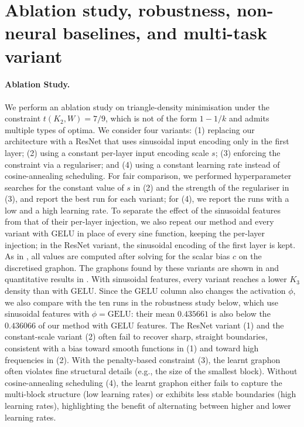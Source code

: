 \documentclass[11pt]{article}
\theoremstyle{plain}
\theoremstyle{definition}
\theoremstyle{remark}
\begin{document}
\section{Ablation study, robustness, non-neural baselines, and multi-task variant}
\label{sec:ablation}

\paragraph{Ablation Study.}
We perform an ablation study on triangle-density minimisation under the constraint $t(K_2,W)=7/9$, which is not of the form $1-1/k$ and admits multiple types of optima.
We consider four variants: (1) replacing our architecture with a ResNet that uses sinusoidal input encoding only in the first layer; (2) using a constant per-layer input encoding scale $s$; (3) enforcing the constraint via a regulariser; and (4) using a constant learning rate instead of cosine-annealing scheduling.
For fair comparison, we performed hyperparameter searches for the constant value of $s$ in (2) and the strength of the regulariser in (3), and report the best run for each variant; for (4), we report the runs with a low and a high learning rate.
To separate the effect of the sinusoidal features from that of their per-layer injection, we also repeat our method and every variant with GELU in place of every sine function, keeping the per-layer injection; in the ResNet variant, the sinusoidal encoding of the first layer is kept.
As in , all values are computed after solving for the scalar bias $c$ on the discretised graphon.
The graphons found by these variants are shown in  and quantitative results in .
With sinusoidal features, every variant reaches a lower $K_3$ density than with GELU. Since the GELU column also changes the activation $\phi$, we also compare with the ten runs in the robustness study below, which use sinusoidal features with $\phi = \mathrm{GELU}$: their mean $0.435661$ is also below the $0.436066$ of our method with GELU features.
The ResNet variant (1) and the constant-scale variant (2) often fail to recover sharp, straight boundaries, consistent with a bias toward smooth functions in (1) and toward high frequencies in (2).
With the penalty-based constraint (3), the learnt graphon often violates fine structural details (e.g., the size of the smallest block).
Without cosine-annealing scheduling (4), the learnt graphon either fails to capture the multi-block structure (low learning rates) or exhibits less stable boundaries (high learning rates), highlighting the benefit of alternating between higher and lower learning rates.
\end{document}
